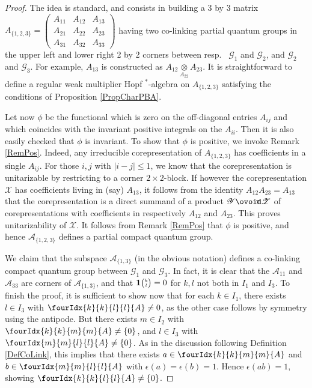\documentclass[10pt]{article}
\newcommand{\Circt}{{\mathop{\ooalign{$\ovoid$\cr\hidewidth\raise-.05ex\hbox{$\scriptstyle\mathsf T\mkern3.5mu$}\cr}}}} %
\newcommand{\Grt}[3]{#1{\tiny {\begin{pmatrix} #2\\#3\end{pmatrix}}}}
\newcommand{\UnitC}[2]{\Grt{\mathbf{1}}{#1}{#2}}
\newcommand{\Gr}[5]{\fourIdx{#2}{#4}{#3}{#5}{#1}}%
\theoremstyle{definition}
\numberwithin{equation}{section}
\begin{document}
\begin{proof} The idea is standard, and consists in building a 3 by 3 matrix $A_{\{1,2,3\}}= \begin{pmatrix} A_{11} & A_{12} &   A_{13} \\ A_{21} & A_{22} & A_{23} \\ A_{31} & A_{32} & A_{33} \end{pmatrix}$ having two co-linking partial quantum groups in the upper left and lower right 2 by 2 corners between resp.~ $\mathscr{G}_1$ and $\mathscr{G}_2$, and $\mathscr{G}_2$ and $\mathscr{G}_3$. For example, $A_{13}$ is constructed as $A_{12}\underset{A_{22}}{\otimes } A_{23}$. It is straightforward to define a regular weak multiplier Hopf $^*$-algebra on $A_{\{1,2,3\}}$ satisfying the conditions of Proposition \ref{PropCharPBA}. 

Let now $\phi$ be the functional which is zero on the off-diagonal entries $A_{ij}$ and which coincides with the invariant positive integrals on the $A_{ii}$. Then it is also easily checked that $\phi$ is invariant. To show that $\phi$ is positive, we invoke Remark \ref{RemPos}. Indeed, any irreducible corepresentation of $A_{\{1,2,3\}}$ has coefficients in a single $A_{ij}$. For those $i,j$ with $|i-j|\leq 1$, we know that the corepresentation is unitarizable by restricting to a corner $2\times 2$-block. If however the corepresentation $\mathscr{X}$ has coefficients living in (say) $A_{13}$, it follows from the identity $A_{12}A_{23}=A_{13}$ that the corepresentation is a direct summand of a product $\mathscr{Y}\Circt \mathscr{Z}$ of corepresentations with coefficients in respectively $A_{12}$ and $A_{23}$. This proves unitarizability of $\mathscr{X}$. It follows from Remark \ref{RemPos} that $\phi$ is positive, and hence $\mathscr{A}_{\{1,2,3\}}$ defines a partial compact quantum group.  

We claim that the subspace $\mathscr{A}_{\{1,3\}}$ (in the obvious notation) defines a co-linking compact quantum group between $\mathscr{G}_1$ and $\mathscr{G}_3$. In fact, it is clear that the $\mathscr{A}_{11}$ and $\mathscr{A}_{33}$ are corners of $\mathscr{A}_{\{1,3\}}$, and that $\UnitC{k}{l}=0$ for $k,l$ not both in $I_1$ and $I_{3}$. To finish the proof, it is sufficient to show now that for each $k\in I_1$, there exists $l\in I_{3}$ with $\Gr{A}{k}{l}{k}{l}\neq 0$, as the other case follows by symmetry using the antipode. But there exists $m\in I_2$ with $\Gr{A}{k}{m}{k}{m} \neq \{0\}$, and $l\in I_3$ with $\Gr{A}{m}{l}{m}{l}\neq\{0\}$. As in the discussion following Definition \ref{DefCoLink}, this implies that there exists $a\in \Gr{A}{k}{m}{k}{m}$ and $b\in \Gr{A}{m}{l}{m}{l}$ with $\epsilon(a)=\epsilon(b)=1$. Hence $\epsilon(ab)=1$, showing $\Gr{A}{k}{l}{k}{l}\neq \{0\}$.
\end{proof} 
\end{document}
